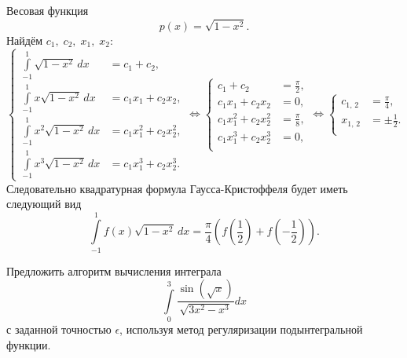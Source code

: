 \documentclass[a4paper]{article}
\begin{document}
\begin{sol}
Весовая функция
\[
	p(x)=\sqrt{1-x^2} 
.\] 
Найдём $c_1,\; c_2,\; x_1,\; x_2$:
\[
\left\{
\begin{aligned}
	\int\limits_{-1}^{1} \sqrt{1-x^2}\,dx&= c_1+c_2,\\
	\int\limits_{-1}^{1} x \sqrt{1-x^2}\,dx&=c_1 x_1+c_2 x_2,\\
	\int\limits_{-1}^{1} x^2\sqrt{1-x^2}\,dx &=c_1 x_1^2+c_2 x_2^2,\\
	\int\limits_{-1}^{1} x^3 \sqrt{1-x^2}\,dx &=c_1 x_1^3+c_2 x_2^3. 
\end{aligned}
\right.
\Leftrightarrow 
\left\{
\begin{aligned}
c_1+c_2 &= \frac{\pi}{2}, \\
c_1 x_1+c_2 x_2 &= 0, \\
c_1 x_1^2+c_2 x_2^2 &= \frac{\pi}{8}, \\
c_1 x_1^3+c_2 x_2^3 &= 0, \\
\end{aligned}
\right.
\Leftrightarrow
\left\{
\begin{aligned}
	c_{1,\,2}&=\frac{\pi}{4},\\
	x_{1,\,2}&=\pm\frac{1}{2}.\\
\end{aligned}
\right.
\] 
Следовательно квадратурная формула Гаусса-Кристоффеля будет
иметь следующий вид
\[
	\int\limits_{-1}^{1} f(x) \sqrt{1-x^2} \, dx=
	\frac{\pi}{4}\left( f\left(\frac{1}{2}\right)+f
	\left( -\frac{1}{2} \right) \right) 
.\] 
\end{sol}
\begin{hiProb}[8.25б]
Предложить алгоритм вычисления интеграла
\[
	\int\limits_{0}^{3} \frac{\sin \left( \sqrt{x}  \right) }{\sqrt{3x^2-x^3} }dx 
\] с заданной точностью
$\epsilon $, используя метод регуляризации подынтегральной
функции.
\end{hiProb}
\end{document}
